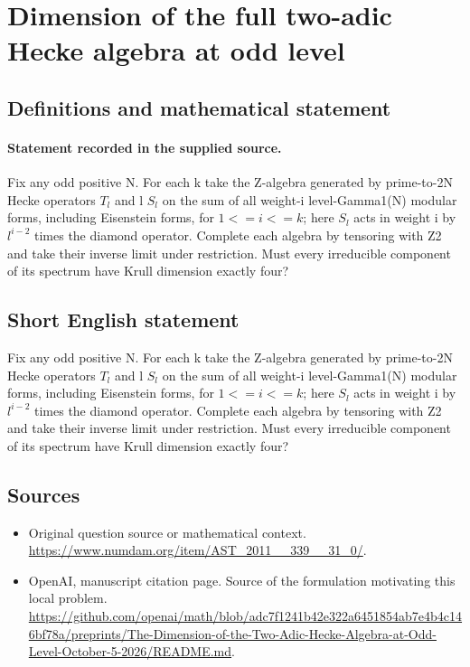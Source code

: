 \documentclass[11pt]{article}
\begin{document}
\section*{Dimension of the full two-adic Hecke algebra at odd level}\label{30007285}
\subsection{Definitions and mathematical statement}
\paragraph{Statement recorded in the supplied source.}
Fix any odd positive N. For each k take the Z-algebra generated by prime-to-2N Hecke operators $T_l$ and l $S_l$ on the sum of all weight-i level-Gamma1(N) modular forms, including Eisenstein forms, for $1<=i<=k$; here $S_l$ acts in weight i by $l^{i-2}$ times the diamond operator. Complete each algebra by tensoring with Z2 and take their inverse limit under restriction. Must every irreducible component of its spectrum have Krull dimension exactly four?
\subsection{Short English statement}
Fix any odd positive N. For each k take the Z-algebra generated by prime-to-2N Hecke operators $T_l$ and l $S_l$ on the sum of all weight-i level-Gamma1(N) modular forms, including Eisenstein forms, for $1<=i<=k$; here $S_l$ acts in weight i by $l^{i-2}$ times the diamond operator. Complete each algebra by tensoring with Z2 and take their inverse limit under restriction. Must every irreducible component of its spectrum have Krull dimension exactly four?
\subsection{Sources}
\begin{itemize}
\item[S1] Original question source or mathematical context.
\url{https://www.numdam.org/item/AST_2011__339__31_0/}.
\item[S2] OpenAI, manuscript citation page. Source of the formulation motivating this local problem.
\url{https://github.com/openai/math/blob/adc7f1241b42e322a6451854ab7e4b4c146bf78a/preprints/The-Dimension-of-the-Two-Adic-Hecke-Algebra-at-Odd-Level-October-5-2026/README.md}.
\end{itemize}
\end{document}
